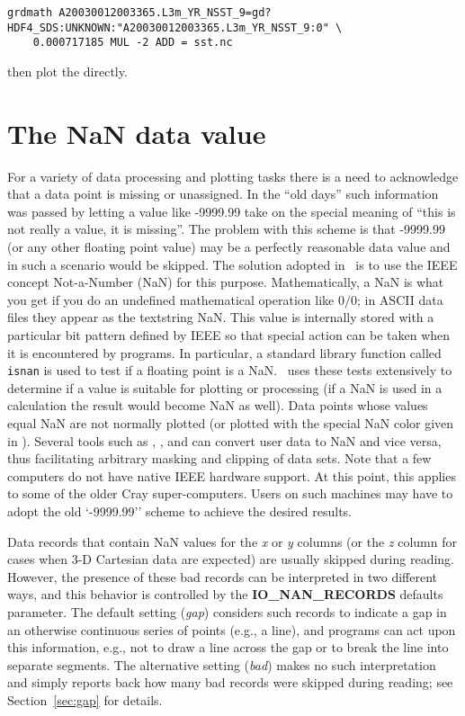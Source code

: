\scriptsize
\begin{verbatim}
grdmath A20030012003365.L3m_YR_NSST_9=gd?HDF4_SDS:UNKNOWN:"A20030012003365.L3m_YR_NSST_9:0" \
	0.000717185 MUL -2 ADD = sst.nc
\end{verbatim}
\normalsize
\noindent
then plot the  directly.


\section{The NaN data value}

For a variety of data processing and plotting tasks there is a need to acknowledge that
a data point is missing or unassigned.  In the ``old days'' such information was passed
by letting a value like -9999.99 take on the special meaning of ``this is not really a
value, it is missing''.  The problem with this scheme is that -9999.99 (or any other
floating point value) may be a perfectly reasonable data value and in such a scenario
would be skipped.  The solution adopted in \GMT\ is to use the IEEE concept Not-a-Number
(NaN) for this purpose.  Mathematically, a NaN is what you get if you do an undefined
mathematical operation like $0/0$; in ASCII data files they appear as the textstring NaN.
This value is internally stored with a particular bit pattern
defined by IEEE so that special action can be taken when it is encountered by programs.
In particular, a standard library function called \texttt{isnan} is used to test if a floating point
is a NaN.  \GMT\ uses these tests extensively to determine if a value is suitable for plotting
or processing (if a NaN is used in a calculation the result would become NaN as well).  Data points
whose values equal NaN are not normally plotted (or plotted with the special NaN color given in
\filename{gmt.conf}).  Several tools such as \GMTprog{xyz2grd}, \GMTprog{gmtmath}, and
\GMTprog{grdmath} can convert user data to NaN and vice versa, thus facilitating arbitrary
masking and clipping of data sets.  Note that a few computers do not have native IEEE hardware
support.  At this point, this applies to some of the older Cray super-computers.  Users on such
machines may have to adopt the old `-9999.99'' scheme to achieve the desired results.

Data records that contain NaN values for the \emph{x} or \emph{y} columns (or the \emph{z} column
for cases when 3-D Cartesian data are expected) are usually skipped during reading.  However,
the presence of these bad records can be interpreted in two different ways, and this behavior
is controlled by the \textbf{IO\_NAN\_RECORDS} defaults parameter.  The default setting (\emph{gap})
considers such records to indicate a gap in an otherwise continuous series of points (e.g., a line),
and programs can act upon this information, e.g., not to draw a line across the gap or to break the line
into separate segments.  The alternative setting (\emph{bad}) makes no such interpretation and
simply reports back how many bad records were skipped during reading; see Section~\ref{sec:gap} for details.

